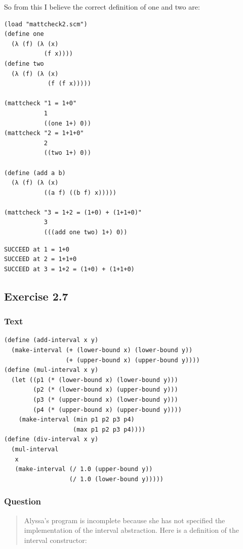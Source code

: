 \documentclass[final,fleqn,titlepage]{article}
\begin{document}
So from this I believe the correct definition of one and two are:
\begin{verbatim}
(load "mattcheck2.scm")
(define one
  (λ (f) (λ (x)
           (f x))))
(define two
  (λ (f) (λ (x)
            (f (f x)))))

(mattcheck "1 = 1+0"
           1
           ((one 1+) 0))
(mattcheck "2 = 1+1+0"
           2
           ((two 1+) 0))

(define (add a b)
  (λ (f) (λ (x)
           ((a f) ((b f) x)))))

(mattcheck "3 = 1+2 = (1+0) + (1+1+0)"
           3
           (((add one two) 1+) 0))
\end{verbatim}

\begin{verbatim}
SUCCEED at 1 = 1+0
SUCCEED at 2 = 1+1+0
SUCCEED at 3 = 1+2 = (1+0) + (1+1+0)
\end{verbatim}

\subsection{Exercise 2.7}
\label{sec:org7c787b8}
\subsubsection{Text}
\label{sec:org0484b42}
\begin{verbatim}
(define (add-interval x y)
  (make-interval (+ (lower-bound x) (lower-bound y))
                 (+ (upper-bound x) (upper-bound y))))
(define (mul-interval x y)
  (let ((p1 (* (lower-bound x) (lower-bound y)))
        (p2 (* (lower-bound x) (upper-bound y)))
        (p3 (* (upper-bound x) (lower-bound y)))
        (p4 (* (upper-bound x) (upper-bound y))))
    (make-interval (min p1 p2 p3 p4)
                   (max p1 p2 p3 p4))))
(define (div-interval x y)
  (mul-interval
   x
   (make-interval (/ 1.0 (upper-bound y))
                  (/ 1.0 (lower-bound y)))))
\end{verbatim}
\subsubsection{Question}
\label{sec:org3bf8f42}
\begin{quote}
Alyssa's program is incomplete because she has not specified the implementation
of the interval abstraction. Here is a definition of the interval constructor:
\end{quote}
\end{document}
